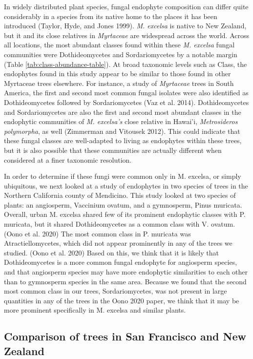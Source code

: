 \documentclass[fleqn,10pt,lineno]{wlpeerj} %
\begin{document}
In widely distributed plant species, fungal endophyte composition can differ quite considerably in a species from its native home to the places it has been introduced (Taylor, Hyde, and Jones 1999). \emph{M. excelsa} is native to New Zealand, but it and its close relatives in \emph{Myrtaceae} are widespread across the world. Across all locations, the most abundant classes found within these \emph{M. excelsa} fungal communities were Dothideomycetes and Sordariomycetes by a notable margin (Table \ref{tab:class-abundance-table}). At broad taxonomic levels such as Class, the endophytes found in this study appear to be similar to those found in other Myrtaceae trees elsewhere. For instance, a study of \emph{Myrtaceae} trees in South America, the first and second most common fungal isolates were also identified as Dothideomycetes followed by Sordariomycetes (Vaz et al. 2014). Dothideomycetes and Sordariomycetes are also the first and second most abundant classes in the endophytic communities of \emph{M. excelsa's} close relative in Hawai'i, \emph{Metrosideros polymorpha}, as well (Zimmerman and Vitousek 2012). This could indicate that these fungal classes are well-adapted to living as endophytes within these trees, but it is also possible that these communities are actually different when considered at a finer taxonomic resolution.

In order to determine if these fungi were common only in M. excelsa, or simply ubiquitous, we next looked at a study of endophytes in two species of trees in the Northern California county of Mendicino. This study looked at two species of plants: an angiosperm, Vaccinium ovatum, and a gymnosperm, Pinus muricata. Overall, urban M. excelsa shared few of its prominent endophytic classes with P. muricata, but it shared Dothideomycetes as a common class with V. ovatum. (Oono et al. 2020) The most common class in P. muricata was Atractiellomycetes, which did not appear prominently in any of the trees we studied. (Oono et al. 2020) Based on this, we think that it is likely that Dothideomycetes is a more common fungal endophyte for angiosperm species, and that angiosperm species may have more endophytic similarities to each other than to gymnosperm species in the same area. Because we found that the second most common class in our trees, Sordariomycetes, was not present in large quantities in any of the trees in the Oono 2020 paper, we think that it may be more prominent specifically in M. excelsa and similar plants.

\hypertarget{comparison-of-trees-in-san-francisco-and-new-zealand}{%
\subsection*{Comparison of trees in San Francisco and New Zealand}\label{comparison-of-trees-in-san-francisco-and-new-zealand}}
\end{document}
